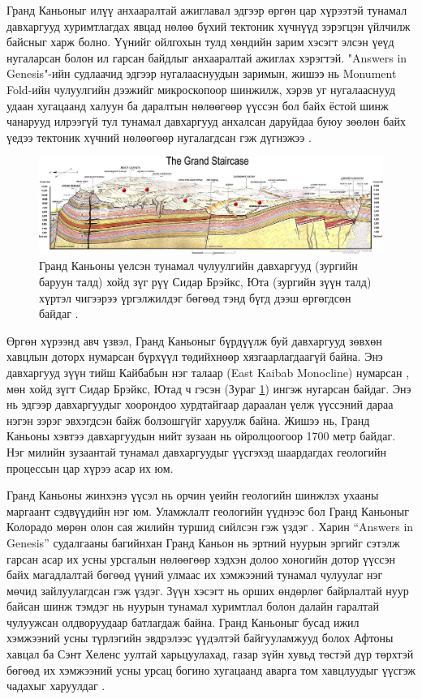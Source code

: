\documentclass[10pt,twocolumn,letterpaper]{article}
\begin{document}
Гранд Каньоныг илүү анхааралтай ажиглавал эдгээр өргөн цар хүрээтэй тунамал давхаргууд хуримтлагдах явцад нөлөө бүхий тектоник хүчнүүд зэрэгцэн үйлчилж байсныг харж болно. Үүнийг ойлгохын тулд хөндийн зарим хэсэгт элсэн үеүд нугаларсан болон ил гарсан байдлыг анхааралтай ажиглах хэрэгтэй. "Answers in Genesis"-ийн судлаачид \cite{42} эдгээр нугалааснуудын заримын, жишээ нь Monument Fold-ийн чулуулгийн дээжийг микроскопоор шинжилж, хэрэв уг нугалааснууд удаан хугацаанд халуун ба даралтын нөлөөгөөр үүссэн бол байх ёстой шинж чанарууд илрээгүй тул тунамал давхаргууд анхалсан даруйдаа буюу зөөлөн байх үедээ тектоник хүчний нөлөөгөөр нугалагдсан гэж дүгнэжээ \cite{43}.

\begin{figure}
\begin{center}

\includegraphics[width=1\textwidth]{Grand_Staircase-big.jpg}
\end{center}
   \caption{Гранд Каньоны үелсэн тунамал чулуулгийн давхаргууд (зургийн баруун талд) хойд зүг рүү Сидар Брэйкс, Юта (зургийн зүүн талд) хүртэл чигээрээ үргэлжилдэг бөгөөд тэнд бүгд дээш өргөгдсөн байдаг \cite{50}.}
\label{fig:4}
\end{figure}

Өргөн хүрээнд авч үзвэл, Гранд Каньоныг бүрдүүлж буй давхаргууд зөвхөн хавцлын доторх нумарсан бүрхүүл төдийхнөөр хязгаарлагдаагүй байна. Энэ давхаргууд зүүн тийш Кайбабын нэг талаар (East Kaibab Monocline) нумарсан \cite{46}, мөн хойд зүгт Сидар Брэйкс, Ютад ч гэсэн (Зураг \ref{fig:4}) ингэж нугарсан байдаг. Энэ нь эдгээр давхаргуудыг хоорондоо хурдтайгаар дараалан үелж үүссэний дараа нэгэн зэрэг эвхэгдсэн байж болзошгүйг харуулж байна. Жишээ нь, Гранд Каньоны хэвтээ давхаргуудын нийт зузаан нь ойролцоогоор 1700 метр байдаг. Нэг милийн зузаантай тунамал давхаргуудыг үүсгэхэд шаардагдах геологийн процессын цар хүрээ асар их юм.

Гранд Каньоны жинхэнэ үүсэл нь орчин үеийн геологийн шинжлэх ухааны маргаант сэдвүүдийн нэг юм. Уламжлалт геологийн үүднээс бол Гранд Каньоныг Колорадо мөрөн олон сая жилийн туршид сийлсэн гэж үздэг \cite{47}. Харин “Answers in Genesis” судалгааны багийнхан Гранд Каньон нь эртний нуурын эргийг сэтэлж гарсан асар их усны урсгалын нөлөөгөөр хэдхэн долоо хоногийн дотор үүссэн байх магадлалтай бөгөөд үүний улмаас их хэмжээний тунамал чулуулаг нэг мөчид зайлуулагдсан гэж үздэг. Зүүн хэсэгт нь орших өндөрлөг байрлалтай нуур байсан шинж тэмдэг нь нуурын тунамал хуримтлал болон далайн гаралтай чулуужсан олдворуудаар батлагдаж байна. Гранд Каньоныг бусад ижил хэмжээний усны түрлэгийн эвдрэлээс үүдэлтэй байгууламжууд болох Афтоны хавцал ба Сэнт Хеленс уултай харьцуулахад, газар зүйн хувьд төстэй дүр төрхтэй бөгөөд их хэмжээний усны урсац богино хугацаанд аварга том хавцлуудыг үүсгэж чадахыг харуулдаг \cite{48}.
\end{document}
